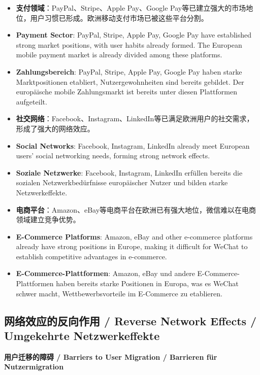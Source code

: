 \documentclass[11pt,a4paper]{article}
\begin{document}
\begin{itemize}
    
    \item \textbf{支付领域}：PayPal、Stripe、Apple Pay、Google Pay等已建立强大的市场地位，用户习惯已形成。欧洲移动支付市场已被这些平台分割。
    \item \textbf{Payment Sector}: PayPal, Stripe, Apple Pay, Google Pay have established strong market positions, with user habits already formed. The European mobile payment market is already divided among these platforms.
    \item \textbf{Zahlungsbereich}: PayPal, Stripe, Apple Pay, Google Pay haben starke Marktpositionen etabliert, Nutzergewohnheiten sind bereits gebildet. Der europäische mobile Zahlungsmarkt ist bereits unter diesen Plattformen aufgeteilt.
    
    \item \textbf{社交网络}：Facebook、Instagram、LinkedIn等已满足欧洲用户的社交需求，形成了强大的网络效应。
    \item \textbf{Social Networks}: Facebook, Instagram, LinkedIn already meet European users' social networking needs, forming strong network effects.
    \item \textbf{Soziale Netzwerke}: Facebook, Instagram, LinkedIn erfüllen bereits die sozialen Netzwerkbedürfnisse europäischer Nutzer und bilden starke Netzwerkeffekte.
    
    \item \textbf{电商平台}：Amazon、eBay等电商平台在欧洲已有强大地位，微信难以在电商领域建立竞争优势。
    \item \textbf{E-Commerce Platforms}: Amazon, eBay and other e-commerce platforms already have strong positions in Europe, making it difficult for WeChat to establish competitive advantages in e-commerce.
    \item \textbf{E-Commerce-Plattformen}: Amazon, eBay und andere E-Commerce-Plattformen haben bereits starke Positionen in Europa, was es WeChat schwer macht, Wettbewerbsvorteile im E-Commerce zu etablieren.
\end{itemize}

\subsection{网络效应的反向作用 / Reverse Network Effects / Umgekehrte Netzwerkeffekte}

\textbf{用户迁移的障碍 / Barriers to User Migration / Barrieren für Nutzermigration}
\end{document}
